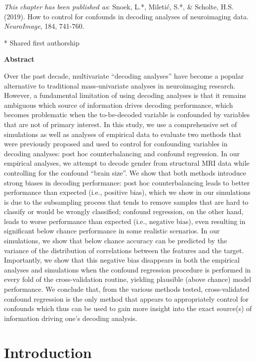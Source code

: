 \documentclass[12pt,american,a4paper,oneside,]{memoir} %
\begin{document}
\small

\noindent
\emph{This chapter has been published as}: Snoek, L.*, Miletić, S.*, \& Scholte, H.S. (2019). How to control for confounds in decoding analyses of neuroimaging data. \emph{NeuroImage}, 184, 741-760.

* Shared first authorship

\newpage
\normalsize

\textbf{Abstract}

Over the past decade, multivariate ``decoding analyses'' have become a popular alternative to traditional mass-univariate analyses in neuroimaging research. However, a fundamental limitation of using decoding analyses is that it remains ambiguous which source of information drives decoding performance, which becomes problematic when the to-be-decoded variable is confounded by variables that are not of primary interest. In this study, we use a comprehensive set of simulations as well as analyses of empirical data to evaluate two methods that were previously proposed and used to control for confounding variables in decoding analyses: post hoc counterbalancing and confound regression. In our empirical analyses, we attempt to decode gender from structural MRI data while controlling for the confound ``brain size''. We show that both methods introduce strong biases in decoding performance: post hoc counterbalancing leads to better performance than expected (i.e., positive bias), which we show in our simulations is due to the subsampling process that tends to remove samples that are hard to classify or would be wrongly classified; confound regression, on the other hand, leads to worse performance than expected (i.e., negative bias), even resulting in significant below chance performance in some realistic scenarios. In our simulations, we show that below chance accuracy can be predicted by the variance of the distribution of correlations between the features and the target. Importantly, we show that this negative bias disappears in both the empirical analyses and simulations when the confound regression procedure is performed in every fold of the cross-validation routine, yielding plausible (above chance) model performance. We conclude that, from the various methods tested, cross-validated confound regression is the only method that appears to appropriately control for confounds which thus can be used to gain more insight into the exact source(s) of information driving one's decoding analysis.

\hypertarget{confounds-decoding-introduction}{%
\section{Introduction}\label{confounds-decoding-introduction}}
\end{document}
